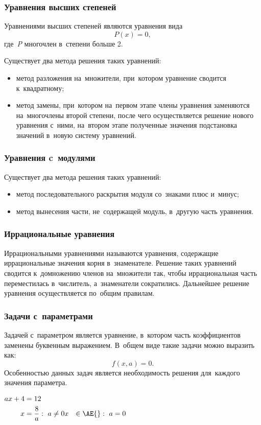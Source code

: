 \documentclass[]{scrartcl}
\begin{document}
\subsubsection{Уравнения высших степеней}
Уравнениями высших степеней являются уравнения вида
\begin{equation}\label{eq:equations-high-power}
P(x)=0,
\end{equation}
где~\textit{P} многочлен в~степени больше 2.

Существует два метода решения таких уравнений:
\begin{itemize}
	\item метод разложения на~множители, при~котором уравнение сводится к~квадратному;
	\item метод замены, при~котором на~первом этапе члены уравнения заменяются на~многочлены второй степени, после чего осуществляется решение нового уравнения с~ними, на~втором этапе полученные значения подстановка значений в~новую систему уравнений.
\end{itemize}
\subsubsection{Уравнения c~модулями}
Существует два метода решения таких уравнений:
\begin{itemize}
	\item метод последовательного раскрытия модуля со~знаками плюс и~минус;
	\item метод вынесения части, не~содержащей модуль, в~другую часть уравнения.
\end{itemize}
\subsubsection{Иррациональные уравнения}
Иррациональными уравнениями называются уравнения, содержащие иррациональные значения корня в~знаменателе. Решение таких уравнений сводится к~домножению членов на~множители так, чтобы иррациональная часть переместилась в~числитель, а~знаменатели сократились. Дальнейшее решение уравнения осуществляется по~общим правилам.
\subsubsection{Задачи с~параметрами}
Задачей с~параметром является уравнение, в~котором часть коэффициентов заменены буквенным выражением.
В~общем виде такие задачи можно выразить как:
\begin{equation}\label{eq:tasks-with-pararmetres}
f(x,a) = 0.
\end{equation}
Особенностью данных задач является необходимость решения для~каждого значения параметра.
\begin{Thexmpl}\label{ex:tasks-with-parametres-1}
	$\begin{aligned}
		ax+4&=12\\
		x&=\frac{8}{a}:\ a \neq 0
		x&\in \AE{}:\ a=0
	\end{aligned}$
\end{Thexmpl} 
\end{document}
